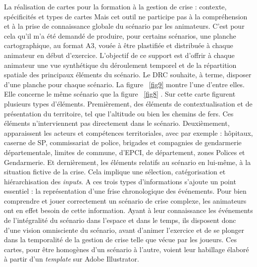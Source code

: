 \documentclass[10pt,a4paper]{report} %
\begin{document}
\begin{part}{La réalisation de cartes pour la formation à la gestion de crise : contexte, spécificités et types de cartes}
Mais cet outil ne participe pas à la compréhension et à la prise de connaissance globale du scénario par les animateurs. C’est pour cela qu’il m’a été demandé de produire, pour certains scénarios, une planche cartographique, au format A3, vouée à être plastifiée et distribuée à chaque animateur en début d’exercice. L’objectif de ce support est d’offrir à chaque animateur une vue synthétique du déroulement temporel et de la répartition spatiale des principaux éléments du scénario. Le DRC souhaite, à terme, disposer d’une planche pour chaque scénario. La figure ~\ref{fig9} montre l’une d’entre elles. Elle concerne le même scénario que la figure ~\ref{fig8} . Sur cette carte figurent plusieurs types d’éléments. 
Premièrement, des éléments de contextualisation et de présentation du territoire, tel que l’altitude ou bien les chemins de fers. Ces éléments n’interviennent pas directement dans le scénario.  Deuxièmement, apparaissent les acteurs et compétences territoriales, avec par exemple : hôpitaux, caserne de SP, commissariat de police, brigades et compagnies de gendarmerie départementale, limites de commune, d’EPCI, de département, zones Polices et Gendarmerie. Et dernièrement, les éléments relatifs au scénario en lui-même, à la situation fictive de la crise. Cela implique une sélection, catégorisation et hiérarchisation des \textit{inputs}. A ces trois types d’informations s’ajoute un point essentiel : la représentation d’une frise chronologique des événements. Pour bien comprendre et jouer correctement un scénario de crise complexe, les animateurs ont en effet besoin de cette information. Ayant à leur connaissance les événements de l’intégralité du scénario dans l’espace et dans le temps, ils disposent donc d’une vision omnisciente du scénario, avant d’animer l’exercice et de se plonger dans la temporalité de la gestion de crise telle que vécue par les joueurs. 
Ces cartes, pour être homogènes d’un scénario à l’autre, voient leur habillage élaboré à partir d’un \textit{template} sur Adobe Illustrator.


\end{part}
\end{document}
